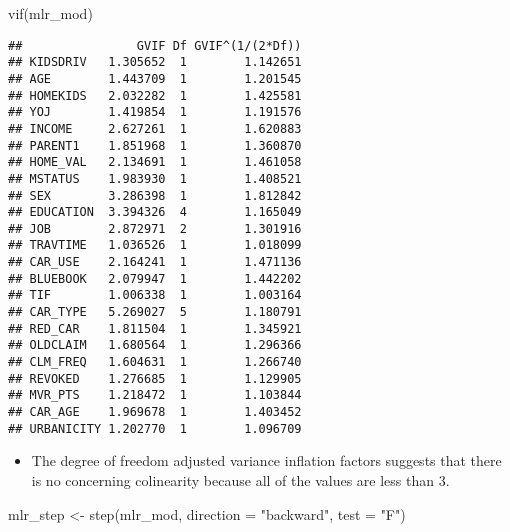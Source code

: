 \documentclass[
]{article}
\newenvironment{Shaded}{\begin{snugshade}}{\end{snugshade}}
\newcommand{\AttributeTok}[1]{\textcolor[rgb]{0.77,0.63,0.00}{#1}}
\newcommand{\FunctionTok}[1]{\textcolor[rgb]{0.00,0.00,0.00}{#1}}
\newcommand{\NormalTok}[1]{#1}
\newcommand{\OtherTok}[1]{\textcolor[rgb]{0.56,0.35,0.01}{#1}}
\newcommand{\StringTok}[1]{\textcolor[rgb]{0.31,0.60,0.02}{#1}}
\providecommand{\tightlist}{%
  \setlength{\itemsep}{0pt}\setlength{\parskip}{0pt}}
\begin{document}
\begin{Shaded}
\begin{Highlighting}[]
\FunctionTok{vif}\NormalTok{(mlr\_mod)}
\end{Highlighting}
\end{Shaded}

\begin{verbatim}
##                GVIF Df GVIF^(1/(2*Df))
## KIDSDRIV   1.305652  1        1.142651
## AGE        1.443709  1        1.201545
## HOMEKIDS   2.032282  1        1.425581
## YOJ        1.419854  1        1.191576
## INCOME     2.627261  1        1.620883
## PARENT1    1.851968  1        1.360870
## HOME_VAL   2.134691  1        1.461058
## MSTATUS    1.983930  1        1.408521
## SEX        3.286398  1        1.812842
## EDUCATION  3.394326  4        1.165049
## JOB        2.872971  2        1.301916
## TRAVTIME   1.036526  1        1.018099
## CAR_USE    2.164241  1        1.471136
## BLUEBOOK   2.079947  1        1.442202
## TIF        1.006338  1        1.003164
## CAR_TYPE   5.269027  5        1.180791
## RED_CAR    1.811504  1        1.345921
## OLDCLAIM   1.680564  1        1.296366
## CLM_FREQ   1.604631  1        1.266740
## REVOKED    1.276685  1        1.129905
## MVR_PTS    1.218472  1        1.103844
## CAR_AGE    1.969678  1        1.403452
## URBANICITY 1.202770  1        1.096709
\end{verbatim}

\begin{itemize}
\tightlist
\item
  The degree of freedom adjusted variance inflation factors suggests
  that there is no concerning colinearity because all of the values are
  less than 3.
\end{itemize}

\begin{Shaded}
\begin{Highlighting}[]
\NormalTok{mlr\_step }\OtherTok{\textless{}{-}} \FunctionTok{step}\NormalTok{(mlr\_mod, }\AttributeTok{direction =} \StringTok{"backward"}\NormalTok{, }\AttributeTok{test =} \StringTok{"F"}\NormalTok{)}
\end{Highlighting}
\end{Shaded}
\end{document}
